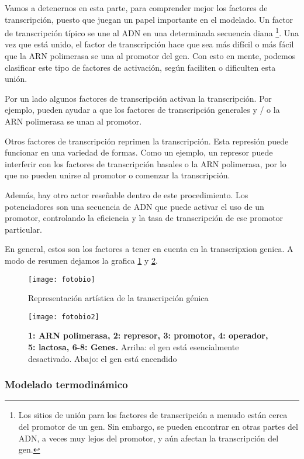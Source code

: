  Vamos a detenernos en esta parte, para comprender mejor los factores de transcripción, puesto que juegan un papel importante en el modelado.
  Un factor de transcripción típico se une al ADN en una determinada secuencia diana \footnote{Los sitios de unión para los factores de transcripción a menudo están cerca del promotor de un gen. Sin embargo, se pueden encontrar en otras partes del ADN, a veces muy lejos del promotor, y aún afectan la transcripción del gen.}. Una vez que está unido, el factor de transcripción hace que sea más difícil o más fácil que la ARN polimerasa se una al promotor del gen. Con esto en mente, podemos clasificar este tipo de factores de activación, según faciliten o dificulten esta unión.
 
 Por un lado algunos factores de transcripción activan la transcripción. Por ejemplo, pueden ayudar a que los factores de transcripción generales y / o la ARN polimerasa se unan al promotor.
 
 Otros factores de transcripción reprimen la transcripción. Esta represión puede funcionar en una variedad de formas. Como un ejemplo, un represor puede interferir con los factores de transcripción basales o la ARN polimerasa, por lo que no pueden unirse al promotor o comenzar la transcripción.
 
 Además, hay otro actor reseñable dentro de este procedimiento. Los potenciadores son una secuencia de ADN que puede activar el uso de un promotor, controlando la eficiencia y la tasa de transcripción de ese promotor particular.
 
 En general, estos son los factores a tener en cuenta en la transcripxion genica. A modo de resumen dejamos la grafica \ref{biologiafoto} y \ref{biofoto2}.
   \begin{figure}[h]
 	\texttt{[image: fotobio]}
 	\centering
 	\caption{Representación artística de la transcripción génica}
 	\label{biologiafoto}
 \end{figure}
    \begin{figure}[h]
 	\texttt{[image: fotobio2]}
 	\centering
 	\caption{\textbf{1: ARN polimerasa, 2: represor, 3: promotor, 4: operador, 5: lactosa, 6-8: Genes.} Arriba: el gen está esencialmente desactivado. Abajo: el gen está encendido}
 	\label{biofoto2}
 \end{figure}
 
 \subsubsection{Modelado termodinámico}
 
